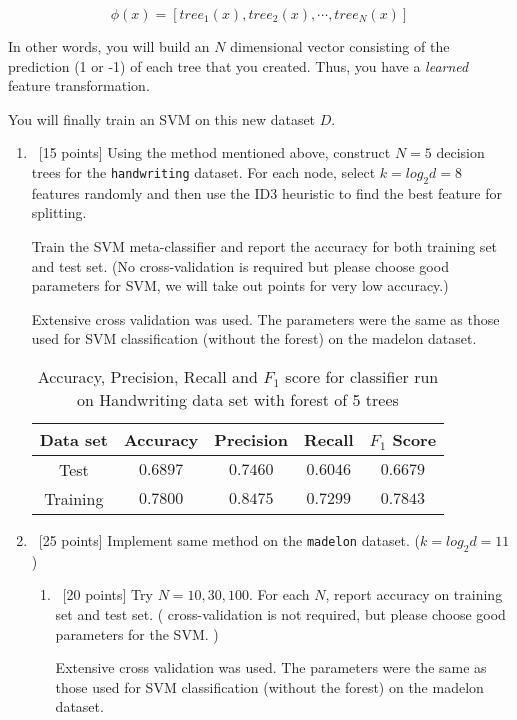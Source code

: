 $$\phi(x) = [tree_1(x), tree_2(x), \cdots, tree_{N} (x)]$$  

In other words, you will build an $N$ dimensional vector consisting of
the prediction (1 or -1) of each tree that you created. Thus, you have
a {\em learned} feature transformation.

You will finally train an SVM on this new dataset $D$.

\begin{enumerate}
\item ~[15 points] Using the method mentioned above, construct
  $N = 5$ decision trees for the {\tt handwriting} dataset. For each
  node, select $k = log_2 d = 8$ features randomly and then use the
  ID3 heuristic to find the best feature for splitting.

  Train the SVM meta-classifier and report the accuracy for both
  training set and test set. (No cross-validation is required but
  please choose good parameters for SVM, we will take out points for
  very low accuracy.)
  
  Extensive cross validation was used. The parameters were the same as those used for SVM classification (without the forest) on the madelon dataset.
      \begin{table}[H]
    \centering
    \begin{tabular}{| c | c | c | c | c |}
      \hline
      Data set & Accuracy & Precision & Recall & $F_1$ Score  \\
      \hline
      Test& $0.6897$ & $0.7460$& $0.6046$& $0.6679$\\
      \hline
      Training& $0.7800$ & $0.8475$& $0.7299$& $0.7843$\\
      \hline
   \end{tabular}
    \caption{Accuracy, Precision, Recall and $F_1$ score for classifier run on Handwriting data set with forest of 5 trees}
  \end{table}   


\item ~[25 points] Implement same method on the {\tt madelon}
  dataset. ($k = log_2 d = 11$)
  \begin{enumerate}
  \item ~[20 points] Try $N = 10, 30, 100$. For each $N$, report
    accuracy on training set and test set. ( cross-validation is not
   required, but please choose good parameters for the SVM. )

  Extensive cross validation was used. The parameters were the same as those used for SVM classification (without the forest) on the madelon dataset.
  

\end{enumerate}
\end{enumerate}
